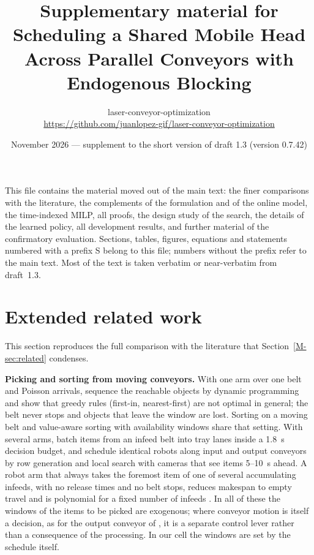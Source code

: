 \documentclass[11pt,a4paper]{article}
\title{\textbf{Supplementary material for}\\[0.3em]
\textbf{Scheduling a Shared Mobile Head Across Parallel Conveyors with Endogenous Blocking}}
\author{laser-conveyor-optimization\\\small\url{https://github.com/juanlopez-gif/laser-conveyor-optimization}}
\date{November 2026 --- supplement to the short version of draft 1.3 (version 0.7.42)}
\theoremstyle{plain}
\theoremstyle{definition}
\theoremstyle{remark}
\begin{document}
\maketitle

This file contains the material moved out of the main text: the finer comparisons with
the literature, the complements of the formulation and of the online model, the
time-indexed MILP, all proofs, the design study of the search, the details of the learned
policy, all development results, and further material of the confirmatory evaluation.
Sections, tables, figures, equations and statements numbered with a prefix S belong to
this file; numbers without the prefix refer to the main text. Most of the text is taken
verbatim or near-verbatim from draft~1.3.

\setcounter{tocdepth}{1}
\tableofcontents
\clearpage

\section{Extended related work}\label{sec:relatedfull}
This section reproduces the full comparison with the literature that Section~\ref{M-sec:related} condenses.

\textbf{Picking and sorting from moving conveyors.} With one arm over one belt and
Poisson arrivals, \cite{S02_Han2020} sequence the reachable objects by dynamic
programming and show that greedy rules (first-in, nearest-first) are not optimal in
general; the belt never stops and objects that leave the window are lost. Sorting on a
moving belt \cite{S01_Mattone2000} and value-aware sorting with availability windows
\cite{S05_Kokkalis2026} share that setting. With several arms, \cite{S03_Nielsen2023}
batch items from an infeed belt into tray lanes inside a 1.8~s decision budget, and
\cite{S04_Schettini2023} schedule identical robots along input and output conveyors by
row generation and local search with cameras that see items 5--10~s ahead. A robot arm
that always takes the foremost item of one of several accumulating infeeds, with no
release times and no belt stops, reduces makespan to empty travel and is polynomial for a
fixed number of infeeds \cite{Li2026}. In all of these the windows of the items to be
picked are exogenous; where conveyor motion is itself a decision, as for the output
conveyor of \cite{S04_Schettini2023}, it is a separate control lever rather than a
consequence of the processing. In our cell the windows are set by the schedule itself.
\end{document}
